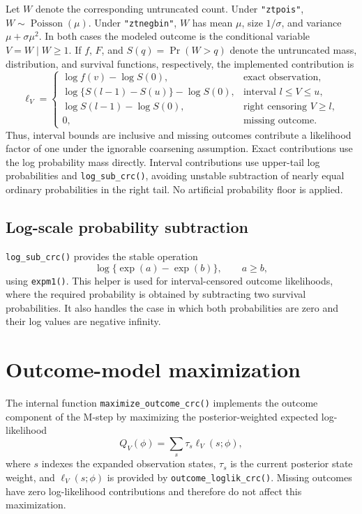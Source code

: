 \documentclass[11pt,letterpaper]{article}
\begin{document}
Let $W$ denote the corresponding untruncated count. Under
\texttt{"ztpois"}, $W\sim\operatorname{Poisson}(\mu)$. Under
\texttt{"ztnegbin"}, $W$ has mean $\mu$, size $1/\sigma$, and variance
$\mu+\sigma\mu^2$. In both cases the modeled outcome is the conditional
variable $V=W\mid W\geq1$. If $f$, $F$, and $S(q)=\Pr(W>q)$ denote the
untruncated mass, distribution, and survival functions, respectively, the
implemented contribution is
\[
  \ell_V=
  \begin{cases}
    \log f(v)-\log S(0), & \text{exact observation},\\
    \log\{S(l-1)-S(u)\}-\log S(0),
      & \text{interval }l\leq V\leq u,\\
    \log S(l-1)-\log S(0), & \text{right censoring }V\geq l,\\
    0, & \text{missing outcome}.
  \end{cases}
\]
Thus, interval bounds are inclusive and missing outcomes contribute a
likelihood factor of one under the ignorable coarsening assumption. Exact
contributions use the log probability mass directly. Interval contributions
use upper-tail log probabilities and \texttt{log\_sub\_crc()}, avoiding
unstable subtraction of nearly equal ordinary probabilities in the right
tail. No artificial probability floor is applied.

\subsection{Log-scale probability subtraction}

\texttt{log\_sub\_crc()} provides the stable operation
\[
  \log\{\exp(a)-\exp(b)\}, \qquad a\geq b,
\]
using \texttt{expm1()}. This helper is used for interval-censored outcome
likelihoods, where the required probability is obtained by subtracting two
survival probabilities. It also handles the case in which both probabilities
are zero and their log values are negative infinity.

\section{Outcome-model maximization}

The internal function \texttt{maximize\_outcome\_crc()} implements the outcome
component of the M-step by maximizing the posterior-weighted
expected log-likelihood
\[
  Q_V(\phi)=\sum_s \tau_s\ell_V(s;\phi),
\]
where $s$ indexes the expanded observation states, $\tau_s$ is the current
posterior state weight, and $\ell_V(s;\phi)$ is provided by
\texttt{outcome\_loglik\_crc()}. Missing outcomes have zero log-likelihood
contributions and therefore do not affect this maximization.
\end{document}

